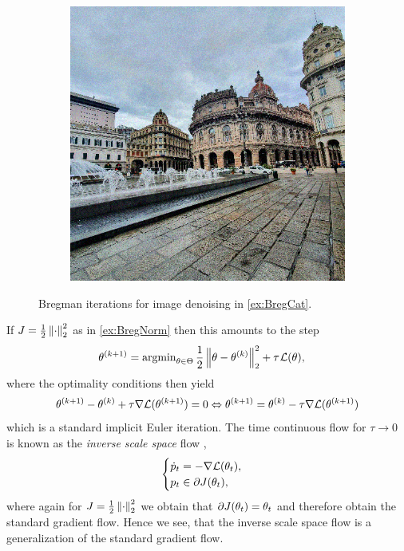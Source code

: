 \begin{figure}
\begin{minipage}{\textwidth}
\begin{subfigure}{.3\textwidth}
		\end{subfigure}\hfill%
		\begin{subfigure}{.3\textwidth}%
			\includegraphics[width=\textwidth]{atelier/breg_cat/data.png}
		\end{subfigure}%
	\end{minipage}%
	\caption{Bregman iterations for image denoising in \cref{ex:BregCat}.}\label{fig:BregCat}
\end{figure}%
%
%
\noindent
If $J=\frac{1}{2}\left\|\cdot\right\|_2^2$ as in \cref{ex:BregNorm} then this amounts to the step
%
\begin{align*}
	\theta^{(k+1)} &= \operatorname{argmin}_{\theta\in\Theta} \frac{1}{2}\left\|\theta - \theta^{(k)}\right\|^2_2 + \tau^{}\mathcal{L}(\theta),
\end{align*}
%
where the optimality conditions then yield
%
\begin{align*}
	\theta^{(k+1)} - \theta^{(k)} + \tau \nabla \mathcal{L}(\theta^{(k+1)}) = 0
	\Leftrightarrow \theta^{(k+1)}= \theta^{(k)} - \tau \nabla \mathcal{L}(\theta^{(k+1)})
\end{align*}
%
which is a standard implicit Euler iteration. The time continuous flow for $\tau\to 0$ is known as the \emph{inverse scale space} flow \cite{burger2006nonlinear,burger2007inverse},
%
\begin{align*}
	\begin{cases}
		\dot{p}_t = - \nabla\mathcal{L}(\theta_t), \\
		p_t \in \partial J(\theta_t),
	\end{cases}
\end{align*}
%
where again for $J=\frac{1}{2}\left\|\cdot\right\|_2^2$ we obtain that $\partial J(\theta_t) = \theta_t$ and therefore obtain the standard gradient flow. Hence we see, that the inverse scale space flow is a generalization of the standard gradient flow. 
%
%
%
